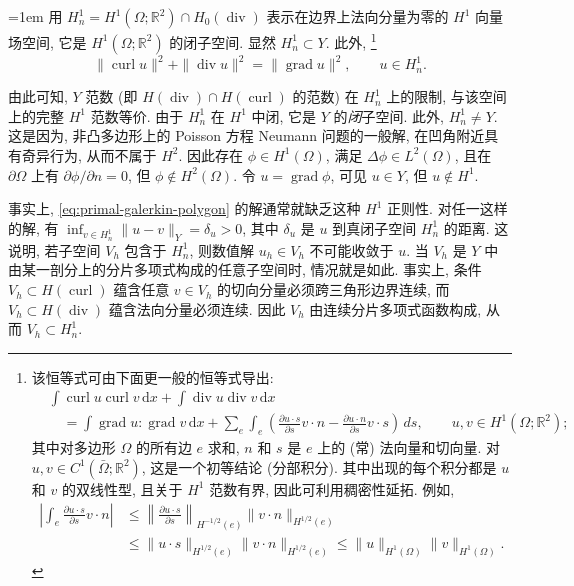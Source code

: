 \begingroup\emergencystretch=1em
用 $H_n^1=H^1(\Omega;\mathbb R^2)\cap H_{0}(\operatorname{div})$ 表示在边界上法向分量为零的 $H^1$ 向量场空间, 它是 $H^1(\Omega;\mathbb R^2)$ 的闭子空间. 显然 $H_n^1\subset Y$. 此外,%
\footnote{{该恒等式可由下面更一般的恒等式导出:}
\[
\begin{aligned}
&\int\operatorname{curl}u\operatorname{curl}v\,\mathrm{d}x+\int\operatorname{div}u\operatorname{div}v\,\mathrm{d}x\\
&\quad=\int\operatorname{grad}u:\operatorname{grad}v\,\mathrm{d}x+\sum_e\int_e\left(\frac{\partial u\cdot s}{\partial s}v\cdot n-\frac{\partial u\cdot n}{\partial s}v\cdot s\right)\,ds,\qquad u,v\in H^1(\Omega;\mathbb R^2);
\end{aligned}
\]
其中对多边形 $\Omega$ 的所有边 $e$ 求和, $n$ 和 $s$ 是 $e$ 上的 (常) 法向量和切向量. 对 $u,v\in C^1(\bar\Omega;\mathbb R^2)$, 这是一个初等结论 (分部积分). 其中出现的每个积分都是 $u$ 和 $v$ 的双线性型, 且关于 $H^1$ 范数有界, 因此可利用稠密性延拓. 例如,
\[
\begin{aligned}
\left|\int_e\frac{\partial u\cdot s}{\partial s}v\cdot n\right|&\leq\left\|\frac{\partial u\cdot s}{\partial s}\right\|_{H^{-1/2}(e)}\|v\cdot n\|_{H^{1/2}(e)}\\
&\leq\|u\cdot s\|_{H^{1/2}(e)}\|v\cdot n\|_{H^{1/2}(e)}\leq\|u\|_{H^1(\Omega)}\|v\|_{H^1(\Omega)}.
\end{aligned}
\]
}%
\[
\|\operatorname{curl}u\|^2+\|\operatorname{div}u\|^2=\|\operatorname{grad}u\|^2,\qquad u\in H_n^1.
\]
\par\endgroup

由此可知, $Y$ 范数 (即 $H(\operatorname{div})\cap H(\operatorname{curl})$ 的范数) 在 $H_n^1$ 上的限制, 与该空间上的完整 $H^1$ 范数等价. 由于 $H_n^1$ 在 $H^1$ 中闭, 它是 $Y$ 的\emph{闭}子空间. 此外, $H_n^1\ne Y$. 这是因为, 非凸多边形上的 Poisson 方程 Neumann 问题的一般解, 在凹角附近具有奇异行为, 从而不属于 $H^2$. 因此存在 $\phi\in H^1(\Omega)$, 满足 $\Delta\phi\in L^2(\Omega)$, 且在 $\partial\Omega$ 上有 $\partial\phi/\partial n=0$, 但 $\phi\notin H^2(\Omega)$. 令 $u=\operatorname{grad}\phi$, 可见 $u\in Y$, 但 $u\notin H^1$.

事实上, \eqref{eq:primal-galerkin-polygon} 的解通常就缺乏这种 $H^1$ 正则性. 对任一这样的解, 有 $\inf_{v\in H_n^1}\|u-v\|_Y=\delta_u>0$, 其中 $\delta_u$ 是 $u$ 到真闭子空间 $H_n^1$ 的距离. 这说明, 若子空间 $V_h$ 包含于 $H_n^1$, 则数值解 $u_h\in V_h$ 不可能收敛于 $u$. 当 $V_h$ 是 $Y$ 中由某一剖分上的分片多项式构成的任意子空间时, 情况就是如此. 事实上, 条件 $V_h\subset H(\operatorname{curl})$ 蕴含任意 $v\in V_h$ 的切向分量必须跨三角形边界连续, 而 $V_h\subset H(\operatorname{div})$ 蕴含法向分量必须连续. 因此 $V_h$ 由连续分片多项式函数构成, 从而 $V_h\subset H_n^1$.

